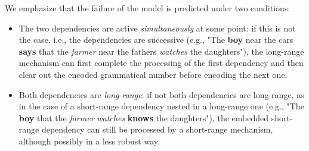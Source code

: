 We emphasize that the failure of the model is predicted under two conditions:
\begin{itemize}
	\item The two dependencies are active \textit{simultaneously} at some point: if this is not the case, i.e., the dependencies are successive (e.g., "The \textbf{boy} near the cars \textbf{says} that the \textit{farmer} near the fathers \textit{watches} the daughters"), the long-range mechanism can first complete the processing of the first dependency and then clear out the encoded grammatical number before encoding the next one. 

    \item Both dependencies are \textit{long-range}: if not both dependencies are long-range, as in the case of a short-range dependency nested in a long-range one (e.g., "The \textbf{boy} that the \textit{farmer} \textit{watches} \textbf{knows} the daughters"), the embedded short-range dependency can still be processed by a short-range mechanism, although possibly in a less robust way. 
\end{itemize}

